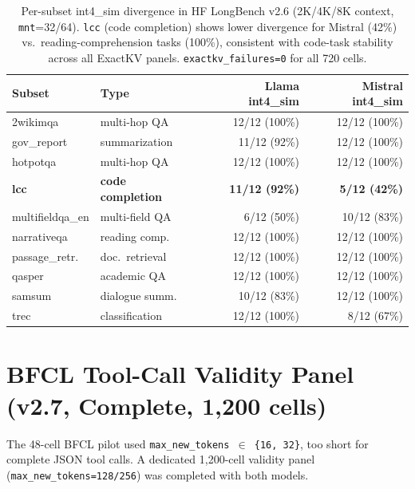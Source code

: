 \documentclass[11pt]{article}
\begin{document}
\begin{table}[htbp]
\centering\small\setlength\tabcolsep{4pt}
\renewcommand{\arraystretch}{1.05}
\begin{tabular}{lllrr}
\toprule
\textbf{Subset} & \textbf{Type} & & \textbf{Llama int4\_sim} & \textbf{Mistral int4\_sim} \\
\midrule
2wikimqa & multi-hop QA & & 12/12 (100\%) & 12/12 (100\%) \\
gov\_report & summarization & & 11/12 (92\%) & 12/12 (100\%) \\
hotpotqa & multi-hop QA & & 12/12 (100\%) & 12/12 (100\%) \\
\textbf{lcc} & \textbf{code completion} & & \textbf{11/12 (92\%)} & \textbf{5/12 (42\%)} \\
multifieldqa\_en & multi-field QA & & 6/12 (50\%) & 10/12 (83\%) \\
narrativeqa & reading comp. & & 12/12 (100\%) & 12/12 (100\%) \\
passage\_retr. & doc.\ retrieval & & 12/12 (100\%) & 12/12 (100\%) \\
qasper & academic QA & & 12/12 (100\%) & 12/12 (100\%) \\
samsum & dialogue summ. & & 10/12 (83\%) & 12/12 (100\%) \\
trec & classification & & 12/12 (100\%) & 8/12 (67\%) \\
\bottomrule
\end{tabular}
\caption{Per-subset int4\_sim divergence in HF LongBench v2.6 (2K/4K/8K context,
\texttt{mnt}=32/64). \texttt{lcc} (code completion) shows lower divergence for Mistral
(42\%) vs.\ reading-comprehension tasks (100\%), consistent with code-task stability
across all ExactKV panels. \texttt{exactkv\_failures=0} for all 720 cells.}
\label{tab:longbench-subset}
\end{table}

\section{BFCL Tool-Call Validity Panel (v2.7, Complete, 1,200 cells)}

The 48-cell BFCL pilot used \texttt{max\_new\_tokens $\in$ \{16,\,32\}}, too short for
complete JSON tool calls. A dedicated 1,200-cell validity panel
(\texttt{max\_new\_tokens=128/256}) was completed with both models.
\end{document}
